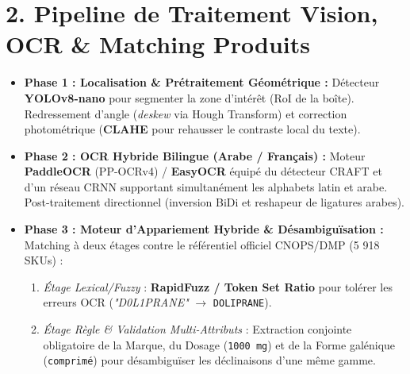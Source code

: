 \documentclass[10pt,a4paper]{article}
\begin{document}
\section*{2. Pipeline de Traitement Vision, OCR \& Matching Produits}
\begin{itemize}
    \item \textbf{Phase 1 : Localisation \& Prétraitement Géométrique :} 
    Détecteur \textbf{YOLOv8-nano} pour segmenter la zone d'intérêt (RoI de la boîte). Redressement d'angle (\textit{deskew} via Hough Transform) et correction photométrique (\textbf{CLAHE} pour rehausser le contraste local du texte).
    \item \textbf{Phase 2 : OCR Hybride Bilingue (Arabe / Français) :}
    Moteur \textbf{PaddleOCR} (PP-OCRv4) / \textbf{EasyOCR} équipé du détecteur CRAFT et d'un réseau CRNN supportant simultanément les alphabets latin et arabe. Post-traitement directionnel (inversion BiDi et reshapeur de ligatures arabes).
    \item \textbf{Phase 3 : Moteur d'Appariement Hybride \& Désambiguïsation :}
    Matching à deux étages contre le référentiel officiel CNOPS/DMP (5 918 SKUs) :
    \begin{enumerate}[label=\alph*),itemsep=1pt,topsep=1pt]
        \item \textit{Étage Lexical/Fuzzy} : \textbf{RapidFuzz / Token Set Ratio} pour tolérer les erreurs OCR (\textit{"D0L1PRANE"} $\rightarrow$ \texttt{DOLIPRANE}).
        \item \textit{Étage Règle \& Validation Multi-Attributs} : Extraction conjointe obligatoire de la Marque, du Dosage (\texttt{1000 mg}) et de la Forme galénique (\texttt{comprimé}) pour désambiguïser les déclinaisons d'une même gamme.
    \end{enumerate}
\end{itemize}

\end{document}
